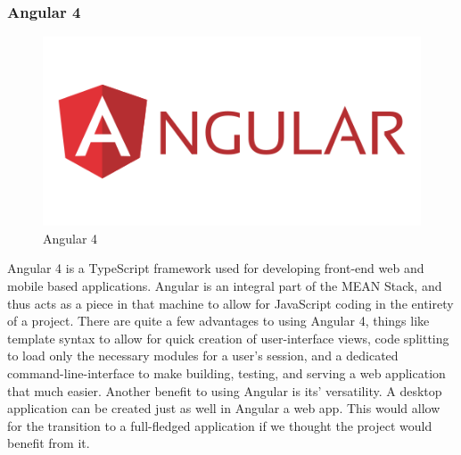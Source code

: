 \documentclass[12pt,a4paper]{report}
\begin{document}
			\subsubsection{Angular 4}
			\begin{figure}
				\includegraphics[scale=.3]{angular_4}
				\caption{Angular 4}
				\label{fig: Angular 4}
			\end{figure}
			Angular 4 is a TypeScript framework used for developing front-end web and mobile based applications. Angular is an integral part of the MEAN Stack, and thus acts as a piece in that machine to allow for JavaScript coding in the entirety of a project. There are quite a few advantages to using Angular 4, things like template syntax to allow for quick creation of user-interface views, code splitting to load only the necessary modules for a user's session, and a dedicated command-line-interface to make building, testing, and serving a web application that much easier. Another benefit to using Angular is its' versatility. A desktop application can be created just as well in Angular a web app. This would allow for the transition to a full-fledged application if we thought the project would benefit from it.
			
			\newpage
\end{document}
